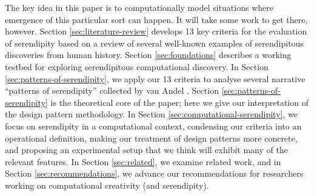 The key idea in this paper is to computationally model situations
where emergence of this particular sort can happen.
%
It will take some work to get there, however.  Section
\ref{sec:literature-review} develops 13 key criteria for the
evaluation of serendipity based on a review of several well-known
examples of serendipitous discoveries from human history.  Section
\ref{sec:foundations} describes a working testbed for exploring
serendipitous computational discovery.  In Section
\ref{sec:patterns-of-serendipity}, we apply our 13 criteria to analyse
several narrative ``patterns of serendipity'' collected by van Andel
\cite{van1994anatomy}.  Section \ref{sec:patterns-of-serendipity} is
the theoretical core of the paper; here we give our interpretation of
the design pattern methodology.  In Section
\ref{sec:computational-serendipity}, we focus on serendipity in a
computational context, condensing our criteria into an operational
definition, making our treatment of design patterns more concrete, and
proposing an experimental setup that we think will exhibit many of the
relevant features.  In Section \ref{sec:related}, we examine related
work, and in Section \ref{sec:recommendations}, we advance our
recommendations for researchers working on computational creativity
(and serendipity).
